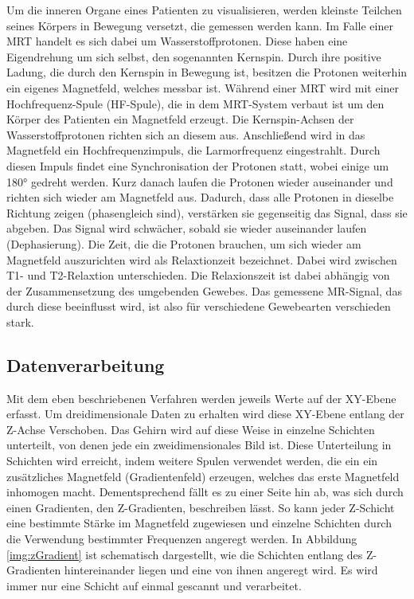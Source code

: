 Um die inneren Organe eines Patienten zu visualisieren, werden kleinste Teilchen seines Körpers in Bewegung versetzt, die gemessen werden kann. Im Falle einer MRT handelt es sich dabei um Wasserstoffprotonen. Diese haben eine Eigendrehung um sich selbst, den sogenannten Kernspin. Durch ihre positive Ladung, die durch den Kernspin in Bewegung ist, besitzen die Protonen weiterhin ein eigenes Magnetfeld, welches messbar ist. 
Während einer MRT wird mit einer Hochfrequenz-Spule (HF-Spule), die in dem MRT-System verbaut ist um den Körper des Patienten ein Magnetfeld erzeugt. Die Kernspin-Achsen der Wasserstoffprotonen richten sich an diesem aus. Anschließend wird in das Magnetfeld ein Hochfrequenzimpuls, die Larmorfrequenz eingestrahlt. Durch diesen Impuls findet eine Synchronisation der Protonen statt, wobei einige um 180° gedreht werden. Kurz danach laufen die Protonen wieder auseinander und richten sich wieder am Magnetfeld aus. 
Dadurch, dass alle Protonen in dieselbe Richtung zeigen (phasengleich sind), verstärken sie gegenseitig das Signal, dass sie abgeben. Das Signal wird schwächer, sobald sie wieder auseinander laufen (Dephasierung).
Die Zeit, die die Protonen brauchen, um sich wieder am Magnetfeld auszurichten wird als Relaxtionzeit bezeichnet. Dabei wird zwischen T1- und T2-Relaxtion unterschieden.
Die Relaxionszeit ist dabei abhängig von der Zusammensetzung des umgebenden Gewebes. Das gemessene MR-Signal, das durch diese beeinflusst wird, ist also für verschiedene Gewebearten verschieden stark.
\cite{weishaupt09}

\subsection{Datenverarbeitung}

Mit dem eben beschriebenen Verfahren werden jeweils Werte auf der XY-Ebene erfasst. Um dreidimensionale Daten zu erhalten wird diese XY-Ebene entlang der Z-Achse Verschoben. Das Gehirn wird auf diese Weise in einzelne Schichten unterteilt, von denen jede ein zweidimensionales Bild ist.
Diese Unterteilung in Schichten wird erreicht, indem weitere Spulen verwendet werden, die ein ein zusätzliches Magnetfeld (Gradientenfeld) erzeugen, welches das erste Magnetfeld inhomogen macht. Dementsprechend fällt es zu einer Seite hin ab, was sich durch einen Gradienten, den Z-Gradienten, beschreiben lässt. So kann jeder Z-Schicht eine bestimmte Stärke im Magnetfeld zugewiesen und einzelne Schichten durch die Verwendung bestimmter Frequenzen angeregt werden. In Abbildung \ref{img:zGradient} ist schematisch dargestellt, wie die Schichten entlang des Z-Gradienten hintereinander liegen und eine von ihnen angeregt wird.
Es wird immer nur eine Schicht auf einmal gescannt und verarbeitet.

